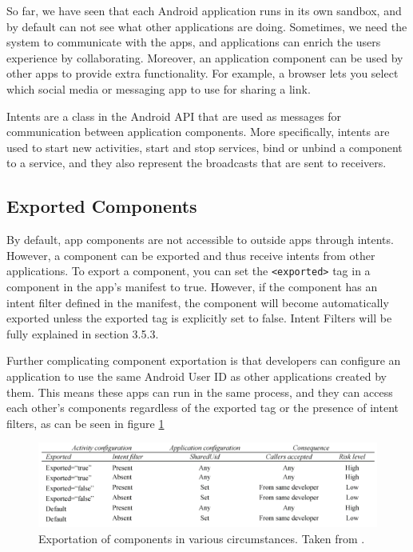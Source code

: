     So far, we have seen that each Android application runs in its own sandbox, and by default can not see what other applications are doing. Sometimes, we need the system to communicate with the apps, and applications can enrich the users experience by collaborating. Moreover, an application component can be used by other apps to provide extra functionality. For example, a browser lets you select which social media or messaging app to use for sharing a link.
    
    Intents are a class in the Android API that are used as messages for communication between application components. More specifically, intents are used to start new activities, start and stop services, bind or unbind a component to a service, and they also represent the broadcasts that are sent to receivers.
    
    \subsection{Exported Components}
        \label{subsec:exported_components}
        
    By default, app components are not accessible to outside apps through intents. However, a component can be exported and thus receive intents from other applications. To export a component, you can set the \lstinline|<exported>| tag in a component in the app’s manifest to true. However, if the component has an intent filter defined in the manifest, the component will become automatically exported unless the exported tag is explicitly set to false. Intent Filters will be fully explained in section 3.5.3.
    
    Further complicating component exportation is that developers can configure an application to use the same Android User ID as other applications created by them. This means these apps can run in the same process, and they can access each other’s components regardless of the exported tag or the presence of intent filters, as can be seen in figure \ref{fig:component_exportation}
    
    \begin{figure}[h]
        \centering
        \includegraphics[width=1\textwidth]{graphics/component exportation.PNG}
        \caption{Exportation of components in various circumstances. Taken from \cite{2013_permission_leaks_study}.}
        \label{fig:component_exportation}
    \end{figure}
    
